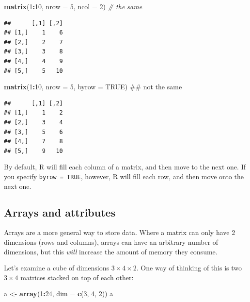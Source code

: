 \documentclass[]{article}
\newenvironment{Shaded}{\begin{snugshade}}{\end{snugshade}}
\newcommand{\KeywordTok}[1]{\textcolor[rgb]{0.13,0.29,0.53}{\textbf{#1}}}
\newcommand{\DataTypeTok}[1]{\textcolor[rgb]{0.13,0.29,0.53}{#1}}
\newcommand{\DecValTok}[1]{\textcolor[rgb]{0.00,0.00,0.81}{#1}}
\newcommand{\StringTok}[1]{\textcolor[rgb]{0.31,0.60,0.02}{#1}}
\newcommand{\CommentTok}[1]{\textcolor[rgb]{0.56,0.35,0.01}{\textit{#1}}}
\newcommand{\OtherTok}[1]{\textcolor[rgb]{0.56,0.35,0.01}{#1}}
\newcommand{\OperatorTok}[1]{\textcolor[rgb]{0.81,0.36,0.00}{\textbf{#1}}}
\newcommand{\NormalTok}[1]{#1}
\begin{document}
\begin{Shaded}
\begin{Highlighting}[]
\KeywordTok{matrix}\NormalTok{(}\DecValTok{1}\OperatorTok{:}\DecValTok{10}\NormalTok{, }\DataTypeTok{nrow =} \DecValTok{5}\NormalTok{, }\DataTypeTok{ncol =} \DecValTok{2}\NormalTok{) }\CommentTok{# the same}
\end{Highlighting}
\end{Shaded}

\begin{verbatim}
##      [,1] [,2]
## [1,]    1    6
## [2,]    2    7
## [3,]    3    8
## [4,]    4    9
## [5,]    5   10
\end{verbatim}

\begin{Shaded}
\begin{Highlighting}[]
\KeywordTok{matrix}\NormalTok{(}\DecValTok{1}\OperatorTok{:}\DecValTok{10}\NormalTok{, }\DataTypeTok{nrow =} \DecValTok{5}\NormalTok{, }\DataTypeTok{byrow =} \OtherTok{TRUE}\NormalTok{) ## not the same}
\end{Highlighting}
\end{Shaded}

\begin{verbatim}
##      [,1] [,2]
## [1,]    1    2
## [2,]    3    4
## [3,]    5    6
## [4,]    7    8
## [5,]    9   10
\end{verbatim}

By default, R will fill each column of a matrix, and then move to the
next one. If you specify \texttt{byrow = TRUE}, however, R will fill
each row, and then move onto the next one.

\clearpage

\subsection{Arrays and attributes}\label{arrays-and-attributes}

Arrays are a more general way to store data. Where a matrix can only
have 2 dimensions (rows and columns), arrays can have an arbitrary
number of dimensions, but this \emph{will} increase the amount of memory
they consume.

Let's examine a cube of dimensions \(3 \times 4 \times 2\). One way of
thinking of this is two \(3 \times 4\) matrices stacked on top of each
other:

\begin{Shaded}
\begin{Highlighting}[]
\NormalTok{a <-}\StringTok{ }\KeywordTok{array}\NormalTok{(}\DecValTok{1}\OperatorTok{:}\DecValTok{24}\NormalTok{, }\DataTypeTok{dim =} \KeywordTok{c}\NormalTok{(}\DecValTok{3}\NormalTok{, }\DecValTok{4}\NormalTok{, }\DecValTok{2}\NormalTok{))}
\NormalTok{a}
\end{Highlighting}
\end{Shaded}
\end{document}
